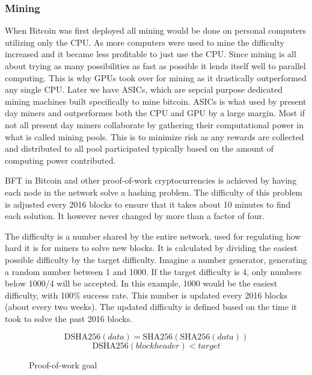 \documentclass[12pt]{article}
\begin{document}
\subsubsection{Mining}\label{subsubsec:mining}

When Bitcoin was first deployed all mining would be done on personal computers utilizing only the CPU. As more computers were used to mine the difficulty increased and it became less profitable to just use the CPU. Since mining is all about trying as many possibilities as fast as possible it lends itself well to parallel computing. This is why GPUs took over for mining as it drastically outperformed any single CPU. Later we have ASICs, which are sepcial purpose dedicated mining machines built specifically to mine bitcoin. ASICs is what used by present day miners and outperformes both the CPU and GPU by a large margin. Most if not all present day miners collaborate by gathering their computational power in what is called mining pools. This is to minimize risk as any rewards are collected and distributed to all pool participated typically based on the amount of computing power contributed. 

BFT in Bitcoin and other proof-of-work cryptocurrencies is achieved by having each node in the network solve a hashing problem. The difficulty of this problem is adjusted every 2016 blocks to ensure that it takes about 10 minutes to find each solution. It however never changed by more than a factor of four\cite{tschorsch2015bitcoin}.

The difficulty is a number shared by the entire network, used for regulating how hard it is for miners to solve new blocks. It is calculated by dividing the easiest possible difficulty by the target difficulty. Imagine a number generator, generating a random number between 1 and 1000. If the target difficulty is 4, only numbers below 1000/4 will be accepted. In this example, 1000 would be the easiest difficulty, with 100\% success rate. This number is updated every 2016 blocks (about every two weeks). The updated difficulty is defined based on the time it took to solve the past 2016 blocks. 

\begin{figure}[h!]
\begin{equation*}
\textrm{DSHA256}(\mathit{data}) = \textrm{SHA256}(\textrm{SHA256}(\mathit{data}))
\end{equation*}
\begin{equation*}
\textrm{DSHA256}(\mathit{blockheader}) < \mathit{target}
\end{equation*}
\caption{Proof-of-work goal}
\end{figure}
\end{document}
